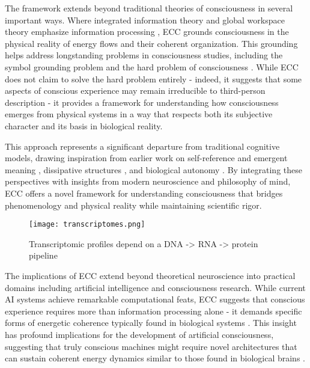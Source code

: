 The framework extends beyond traditional theories of consciousness in several important ways. Where integrated information theory and global workspace theory emphasize information processing \cite{tononi2015consciousness,Baars2019}, ECC grounds consciousness in the physical reality of energy flows and their coherent organization. This grounding helps address longstanding problems in consciousness studies, including the symbol grounding problem and the hard problem of consciousness \cite{harnad1990symbol,chalmers1997conscious}. While ECC does not claim to solve the hard problem entirely - indeed, it suggests that some aspects of conscious experience may remain irreducible to third-person description \cite{nagel1980like,nagel1989view} - it provides a framework for understanding how consciousness emerges from physical systems in a way that respects both its subjective character and its basis in biological reality.

This approach represents a significant departure from traditional cognitive models, drawing inspiration from earlier work on self-reference and emergent meaning \cite{hofstadter1999godel}, dissipative structures \cite{prigogine2018order}, and biological autonomy \cite{bateson2000steps}. By integrating these perspectives with insights from modern neuroscience and philosophy of mind, ECC offers a novel framework for understanding consciousness that bridges phenomenology and physical reality while maintaining scientific rigor.

\begin{figure}[h]
    \centering
    \texttt{[image: transcriptomes.png]}

    \caption{Transcriptomic profiles depend on a DNA -> RNA -> protein pipeline}
\end{figure}

The implications of ECC extend beyond theoretical neuroscience into practical domains including artificial intelligence and consciousness research. While current AI systems achieve remarkable computational feats, ECC suggests that conscious experience requires more than information processing alone - it demands specific forms of energetic coherence typically found in biological systems \cite{thompson2010mind}. This insight has profound implications for the development of artificial consciousness, suggesting that truly conscious machines might require novel architectures that can sustain coherent energy dynamics similar to those found in biological brains \cite{seth2024conscious}.

